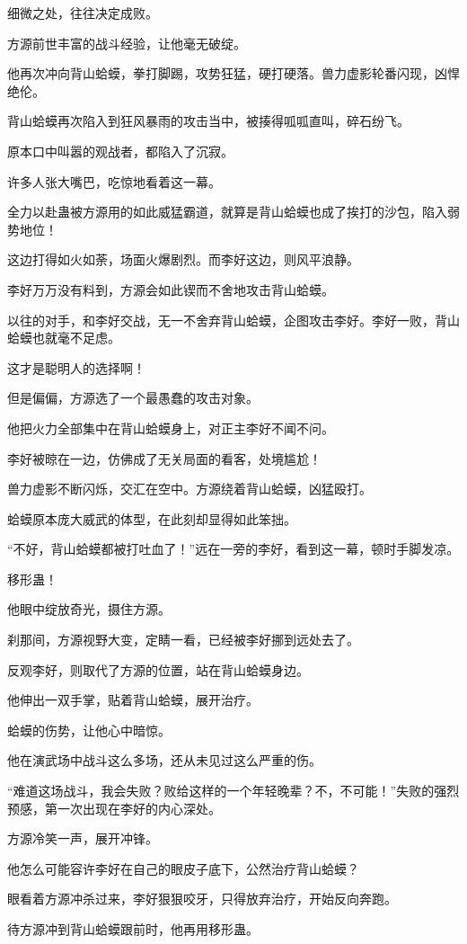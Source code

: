 \begin{this_body}
细微之处，往往决定成败。

方源前世丰富的战斗经验，让他毫无破绽。

他再次冲向背山蛤蟆，拳打脚踢，攻势狂猛，硬打硬落。兽力虚影轮番闪现，凶悍绝伦。

背山蛤蟆再次陷入到狂风暴雨的攻击当中，被揍得呱呱直叫，碎石纷飞。

原本口中叫嚣的观战者，都陷入了沉寂。

许多人张大嘴巴，吃惊地看着这一幕。

全力以赴蛊被方源用的如此威猛霸道，就算是背山蛤蟆也成了挨打的沙包，陷入弱势地位！

这边打得如火如荼，场面火爆剧烈。而李好这边，则风平浪静。

李好万万没有料到，方源会如此锲而不舍地攻击背山蛤蟆。

以往的对手，和李好交战，无一不舍弃背山蛤蟆，企图攻击李好。李好一败，背山蛤蟆也就毫不足虑。

这才是聪明人的选择啊！

但是偏偏，方源选了一个最愚蠢的攻击对象。

他把火力全部集中在背山蛤蟆身上，对正主李好不闻不问。

李好被晾在一边，仿佛成了无关局面的看客，处境尴尬！

兽力虚影不断闪烁，交汇在空中。方源绕着背山蛤蟆，凶猛殴打。

蛤蟆原本庞大威武的体型，在此刻却显得如此笨拙。

“不好，背山蛤蟆都被打吐血了！”远在一旁的李好，看到这一幕，顿时手脚发凉。

移形蛊！

他眼中绽放奇光，摄住方源。

刹那间，方源视野大变，定睛一看，已经被李好挪到远处去了。

反观李好，则取代了方源的位置，站在背山蛤蟆身边。

他伸出一双手掌，贴着背山蛤蟆，展开治疗。

蛤蟆的伤势，让他心中暗惊。

他在演武场中战斗这么多场，还从未见过这么严重的伤。

“难道这场战斗，我会失败？败给这样的一个年轻晚辈？不，不可能！”失败的强烈预感，第一次出现在李好的内心深处。

方源冷笑一声，展开冲锋。

他怎么可能容许李好在自己的眼皮子底下，公然治疗背山蛤蟆？

眼看着方源冲杀过来，李好狠狠咬牙，只得放弃治疗，开始反向奔跑。

待方源冲到背山蛤蟆跟前时，他再用移形蛊。


\end{this_body}
